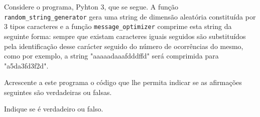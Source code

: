 \documentclass[12pt,varwidth=16cm,border=1pt]{standalone}
\begin{document}
Considere o programa, Pyhton 3, que se segue.  A função \verb+random_string_generator+ gera uma string de dimensão aleatória constituída por 3 tipos caracteres e a função \verb+message_optimizer+ comprime esta string da seguinte forma: sempre que existam caracteres iguais seguidos são substituídos pela identificação desse carácter seguido do número de ocorrências do mesmo, como por exemplo, a string "aaaaadaaafdddffd" será comprimida para "a5da3fd3f2d".



Acrescente a este programa o código que lhe permita indicar se as
afirmações seguintes são verdadeiras ou falsas.

Indique se é verdadeiro ou falso.
\end{document}
